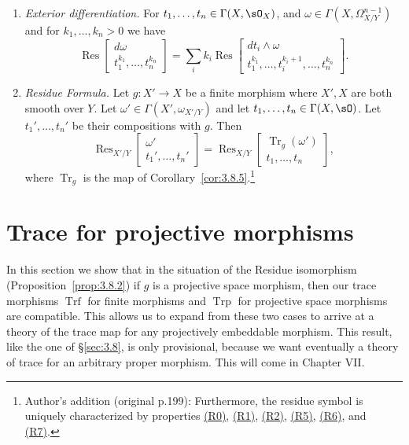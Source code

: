 \begin{enumerate}
\item[(R9)]\label{res:R9} \emph{Exterior differentiation.} For $t_1,\dots,t_n\in\Gamma(X,\sO_X)$, and $\omega\in\Gamma(X,\Omega_{X/Y}^{n-1})$ and for $k_1,\dots,k_n>0$ we have
\[
\operatorname{Res}\begin{bmatrix} d\omega \\ t_1^{k_1},\dots,t_n^{k_n} \end{bmatrix} = \sum_i k_i \operatorname{Res}\begin{bmatrix} dt_i\wedge\omega \\ t_1^{k_1},\dots,t_i^{k_i+1},\dots,t_n^{k_n} \end{bmatrix}.
\]
\item[(R10)]\label{res:R10} \emph{Residue Formula.} Let $g\colon X'\to X$ be a finite morphism where $X',X$ are both smooth over $Y$. Let $\omega'\in\Gamma(X',\omega_{X'/Y})$ and let $t_1,\dots,t_n\in\Gamma(X,\sO)$. Let $t_1',\dots,t_n'$ be their compositions with $g$. Then
\[
\operatorname{Res}_{X'/Y}\begin{bmatrix} \omega' \\ t_1',\dots,t_n' \end{bmatrix} = \operatorname{Res}_{X/Y}\begin{bmatrix} \operatorname{Tr}_g(\omega') \\ t_1,\dots,t_n \end{bmatrix},
\]
where $\operatorname{Tr}_g$ is the map of Corollary~\ref{cor:3.8.5}.\footnote{Author's addition (original p.199): Furthermore, the residue symbol is uniquely characterized by properties \hyperref[res:R0]{(R0)}, \hyperref[res:R1]{(R1)}, \hyperref[res:R2]{(R2)}, \hyperref[res:R5]{(R5)}, \hyperref[res:R6]{(R6)}, and \hyperref[res:R7]{(R7)}.}
\end{enumerate}



\section{Trace for projective morphisms}\label{sec:3.10}

In this section we show that in the situation of the Residue isomorphism (Proposition~\ref{prop:3.8.2}) if $g$ is a projective space morphism, then our trace morphisms $\operatorname{Trf}$ for finite morphisms and $\operatorname{Trp}$ for projective space morphisms are compatible. This allows us to expand from these two cases to arrive at a theory of the trace map for any projectively embeddable morphism. This result, like the one of \S\ref{sec:3.8}, is only provisional, because we want eventually a theory of trace for an arbitrary proper morphism. This will come in Chapter VII.

